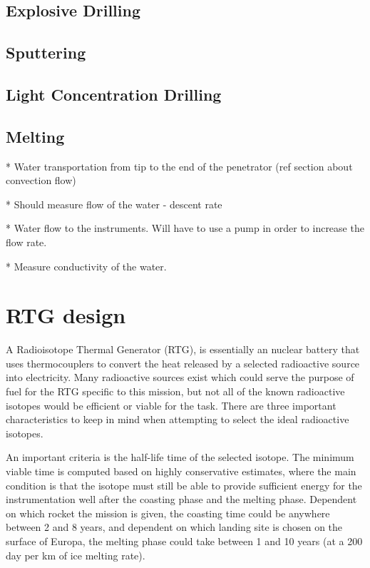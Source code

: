\subsection{Explosive Drilling}

\subsection{Sputtering}



\subsection{Light Concentration Drilling}

\subsection{Melting}


* Water transportation from tip to the end of the penetrator (ref section about convection flow)

* Should measure flow of the water - descent rate

* Water flow to the instruments. Will have to use a pump in order to increase the flow rate.

* Measure conductivity of the water.

\section{RTG design}

A Radioisotope Thermal Generator (RTG), is essentially an nuclear battery that uses thermocouplers to convert the heat released by a selected radioactive source into electricity. Many radioactive sources exist which could serve the purpose of fuel for the RTG specific to this mission, but not all of the known radioactive isotopes would be efficient or viable for the task. There are three important characteristics to keep in mind when attempting to select the ideal radioactive isotopes.

An important criteria is the half-life time of the selected isotope. The minimum viable time is computed based on highly conservative estimates, where the main condition is that the isotope must still be able to provide sufficient energy for the instrumentation well after the coasting phase and the melting phase. Dependent on which rocket the mission is given, the coasting time could be anywhere between 2 and 8 years, and dependent on which landing site is chosen on the surface of Europa, the melting phase could take between 1 and 10 years (at a 200 day per km of ice melting rate). 


